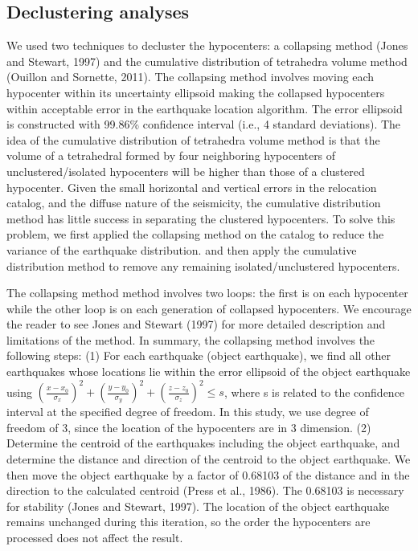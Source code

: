 \documentclass[draft]{agujournal2018}
\begin{document}
\subsection{Declustering analyses}
We used two techniques to decluster the hypocenters: a collapsing method (Jones and Stewart, 1997) and the cumulative distribution of tetrahedra volume method (Ouillon and Sornette, 2011). The collapsing method involves moving each hypocenter within its uncertainty ellipsoid making the collapsed hypocenters within acceptable error in the earthquake location algorithm. The error ellipsoid is constructed with 99.86\% confidence interval (i.e., 4 standard deviations). The idea of the cumulative distribution of tetrahedra volume method is that the volume of a tetrahedral formed by four neighboring hypocenters of unclustered/isolated hypocenters will be higher than those of a clustered hypocenter. Given the small horizontal and vertical errors in the relocation catalog, and the diffuse nature of the seismicity, the cumulative distribution method has little success in separating the clustered hypocenters. To solve this problem, we first applied the collapsing method on the catalog to reduce the variance of the earthquake distribution. and then apply the cumulative distribution method to remove any remaining isolated/unclustered hypocenters.
 
The collapsing method method involves two loops: the first is on each hypocenter while the other loop is on each generation of collapsed hypocenters. We encourage the reader to see Jones and Stewart (1997) for more detailed description and limitations of the method. %
In summary, the collapsing method involves the following steps: (1) For each earthquake (object earthquake), we find all other earthquakes whose locations lie within the error ellipsoid of the object earthquake using $(\frac{x-x_0}{\sigma_x})^2 + (\frac{y-y_0}{\sigma_y})^2 + (\frac{z-z_0}{\sigma_z})^2 \le s $, where s is related to the confidence interval at the specified degree of freedom. In this study, we use degree of freedom of 3, since the location of the hypocenters are in 3 dimension. (2) Determine the centroid of the earthquakes including the object earthquake, and determine the distance and direction of the centroid to the object earthquake. We then move the object earthquake by a factor of 0.68103 of the distance and in the direction to the calculated centroid (Press et al., 1986). The 0.68103 is necessary for stability (Jones and Stewart, 1997). The location of the object earthquake remains unchanged during this iteration, so the order the hypocenters are processed does not affect the result. 
\end{document}
